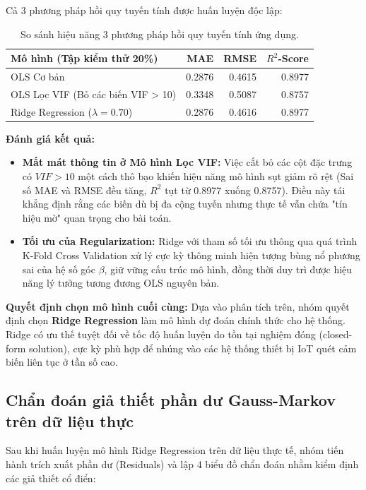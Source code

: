 \documentclass[12pt,a4paper]{article}
\begin{document}
Cả 3 phương pháp hồi quy tuyến tính được huấn luyện độc lập:

\begin{table}[H]
    \centering
    \begin{tabular}{lrrr}
        \toprule
        \textbf{Mô hình (Tập kiểm thử 20\%)} & \textbf{MAE} & \textbf{RMSE} & \textbf{$R^2$-Score} \\
        \midrule
        OLS Cơ bản & 0.2876 & 0.4615 & 0.8977 \\
        OLS Lọc VIF (Bỏ các biến VIF > 10) & 0.3348 & 0.5087 & 0.8757 \\
        Ridge Regression ($\lambda = 0.70$) & 0.2876 & 0.4616 & 0.8977 \\
        \bottomrule
    \end{tabular}
    \caption{So sánh hiệu năng 3 phương pháp hồi quy tuyến tính ứng dụng.}
\end{table}

\textbf{Đánh giá kết quả:}
\begin{itemize}
    \item \textbf{Mất mát thông tin ở Mô hình Lọc VIF:} Việc cắt bỏ các cột đặc trưng có $VIF > 10$ một cách thô bạo khiến hiệu năng mô hình sụt giảm rõ rệt (Sai số MAE và RMSE đều tăng, $R^2$ tụt từ 0.8977 xuống 0.8757). Điều này tái khẳng định rằng các biến dù bị đa cộng tuyến nhưng thực tế vẫn chứa "tín hiệu mờ" quan trọng cho bài toán.
    \item \textbf{Tối ưu của Regularization:} Ridge với tham số tối ưu thông qua quá trình K-Fold Cross Validation xử lý cực kỳ thông minh hiện tượng bùng nổ phương sai của hệ số góc $\beta$, giữ vững cấu trúc mô hình, đồng thời duy trì được hiệu năng lý tưởng tương đương OLS nguyên bản.
\end{itemize}

\textbf{Quyết định chọn mô hình cuối cùng:} Dựa vào phân tích trên, nhóm quyết định chọn \textbf{Ridge Regression} làm mô hình dự đoán chính thức cho hệ thống. Ridge có ưu thế tuyệt đối về tốc độ huấn luyện do tồn tại nghiệm đóng (closed-form solution), cực kỳ phù hợp để nhúng vào các hệ thống thiết bị IoT quét cảm biến liên tục ở tần số cao.

\subsection{Chẩn đoán giả thiết phần dư Gauss-Markov trên dữ liệu thực}
Sau khi huấn luyện mô hình Ridge Regression trên dữ liệu thực tế, nhóm tiến hành trích xuất phần dư (Residuals) và lập 4 biểu đồ chẩn đoán nhằm kiểm định các giả thiết cổ điển:
\end{document}
